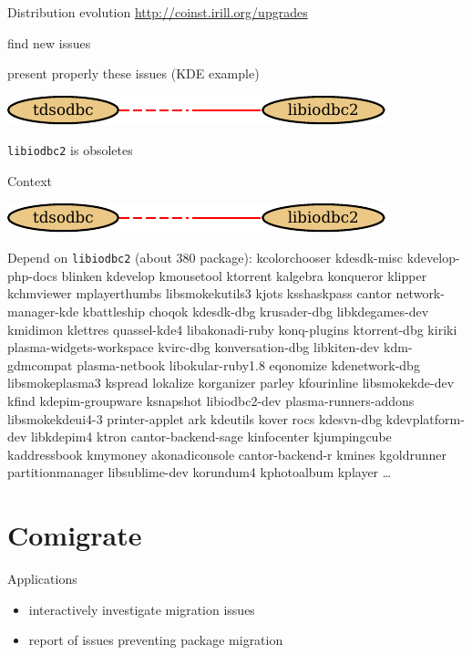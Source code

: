\documentclass[xcolor={dvipsnames}]{beamer}
\begin{document}
\begin{frame}{Distribution evolution}
\url{http://coinst.irill.org/upgrades}

find new issues

present properly these issues (KDE example)

\begin{center}
\includegraphics{figures/libiodbc2}
\end{center}

\texttt{libiodbc2} is obsoletes

\end{frame}

\begin{frame}{Context}
\begin{center}
\includegraphics{figures/libiodbc2}
\end{center}
Depend on \texttt{libiodbc2} (about 380 package):
kcolorchooser kdesdk-misc kdevelop-php-docs blinken kdevelop
kmousetool ktorrent kalgebra konqueror klipper kchmviewer
mplayerthumbs libsmokekutils3 kjots ksshaskpass cantor
network-manager-kde kbattleship choqok kdesdk-dbg krusader-dbg
libkdegames-dev kmidimon klettres quassel-kde4 libakonadi-ruby
konq-plugins ktorrent-dbg kiriki plasma-widgets-workspace kvirc-dbg
konversation-dbg libkiten-dev kdm-gdmcompat plasma-netbook
libokular-ruby1.8 eqonomize kdenetwork-dbg libsmokeplasma3 kspread
lokalize korganizer parley kfourinline libsmokekde-dev kfind
kdepim-groupware ksnapshot libiodbc2-dev plasma-runners-addons
libsmokekdeui4-3 printer-applet ark kdeutils kover rocs kdesvn-dbg
kdevplatform-dev libkdepim4 ktron cantor-backend-sage kinfocenter
kjumpingcube kaddressbook kmymoney akonadiconsole cantor-backend-r
kmines kgoldrunner partitionmanager libsublime-dev korundum4
kphotoalbum kplayer
\ldots

\end{frame}

\part{Comigrate}
\frame{\partpage}

\begin{frame}{Applications}
\begin{itemize}
\item interactively investigate migration issues
\item report of issues preventing package migration
\end{itemize}
\end{frame}
\end{document}
